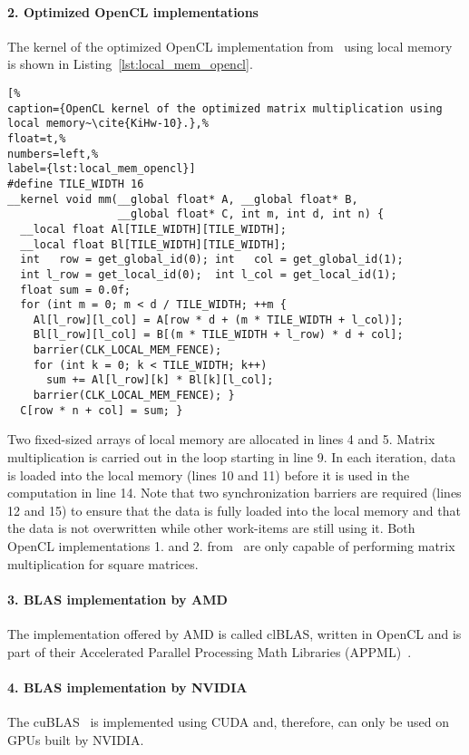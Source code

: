 \paragraph{2. Optimized OpenCL implementations}
The kernel of the optimized OpenCL implementation from~\cite{KiHw-10} using local memory is shown in Listing~\ref{lst:local_mem_opencl}.
\begin{lstlisting}[%                                                             
caption={OpenCL kernel of the optimized matrix multiplication using local memory~\cite{KiHw-10}.},%
float=t,%
numbers=left,%
label={lst:local_mem_opencl}]
#define TILE_WIDTH 16
__kernel void mm(__global float* A, __global float* B,
                 __global float* C, int m, int d, int n) {
  __local float Al[TILE_WIDTH][TILE_WIDTH];
  __local float Bl[TILE_WIDTH][TILE_WIDTH];
  int   row = get_global_id(0); int   col = get_global_id(1);
  int l_row = get_local_id(0);  int l_col = get_local_id(1);
  float sum = 0.0f;
  for (int m = 0; m < d / TILE_WIDTH; ++m {
    Al[l_row][l_col] = A[row * d + (m * TILE_WIDTH + l_col)];
    Bl[l_row][l_col] = B[(m * TILE_WIDTH + l_row) * d + col];
    barrier(CLK_LOCAL_MEM_FENCE);
    for (int k = 0; k < TILE_WIDTH; k++)
      sum += Al[l_row][k] * Bl[k][l_col];
    barrier(CLK_LOCAL_MEM_FENCE); }
  C[row * n + col] = sum; }
\end{lstlisting}
Two fixed-sized arrays of local memory are allocated in lines 4 and 5.
Matrix multiplication is carried out in the loop starting in line 9.
In each iteration, data is loaded into the local memory (lines 10 and 11) before it is used in the computation in line 14.
Note that two synchronization barriers are required (lines 12 and 15) to ensure that the data is fully loaded into the local memory and that the data is not overwritten while other work-items are still using it.
Both OpenCL implementations 1. and 2. from~\cite{KiHw-10} are only capable of performing matrix multiplication for square matrices.

\vspace{-.5em}
\paragraph{3. BLAS implementation by AMD}
The implementation offered by AMD is called clBLAS, written in OpenCL and is part of their Accelerated Parallel Processing Math Libraries (APPML)~\cite{AMD-13}.

\vspace{-.5em}
\paragraph{4. BLAS implementation by NVIDIA}
The cuBLAS~\cite{NVIDIA-13} is implemented using CUDA and, therefore, can only be used on GPUs built by NVIDIA.

